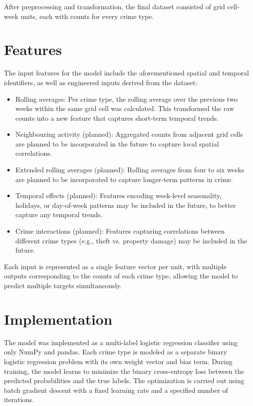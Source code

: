 \documentclass[11pt]{article}
\begin{document}
After preprocessing and transformation, the final dataset consisted of grid cell-week units, each with counts for every crime type.

\section{Features}

The input features for the model include the aforementioned spatial and temporal identifiers, as well as engineered inputs derived from the dataset:

\begin{itemize}
    \item Rolling averages: Per crime type, the rolling average over the previous two weeks within the same grid cell was calculated. This transformed the raw counts into a new feature that captures short-term temporal trends.
    \item Neighbouring activity (planned): Aggregated counts from adjacent grid cells are planned to be incorporated in the future to capture local spatial correlations.
    \item Extended rolling averages (planned): Rolling averages from four to six weeks are planned to be incorporated to capture longer-term patterns in crime.
    \item Temporal effects (planned): Features encoding week-level seasonality, holidays, or day-of-week patterns may be included in the future, to better capture any temporal trends.
    \item Crime interactions (planned): Features capturing correlations between different crime types (e.g., theft vs. property damage) may be included in the future.
\end{itemize}

Each input is represented as a single feature vector per unit, with multiple outputs corresponding to the counts of each crime type, allowing the model to predict multiple targets simultaneously.

\section{Implementation}

The model was implemented as a multi-label logistic regression classifier using only NumPy and pandas. Each crime type is modeled as a separate binary logistic regression problem with its own weight vector and bias term. During training, the model learns to minimize the binary cross-entropy loss between the predicted probabilities and the true labels. The optimization is carried out using batch gradient descent with a fixed learning rate and a specified number of iterations.
\end{document}
